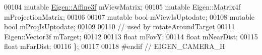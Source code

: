 \begin{DoxyCode}
00104     \textcolor{keyword}{mutable} \hyperlink{group___geometry___module_class_eigen_1_1_transform}{Eigen::Affine3f} mViewMatrix;
00105     \textcolor{keyword}{mutable} Eigen::Matrix4f mProjectionMatrix;
00106 
00107     \textcolor{keyword}{mutable} \textcolor{keywordtype}{bool} mViewIsUptodate;
00108     \textcolor{keyword}{mutable} \textcolor{keywordtype}{bool} mProjIsUptodate;
00109 
00110     \textcolor{comment}{// used by rotateAroundTarget}
00111     Eigen::Vector3f mTarget;
00112     
00113     \textcolor{keywordtype}{float} mFovY;
00114     \textcolor{keywordtype}{float} mNearDist;
00115     \textcolor{keywordtype}{float} mFarDist;
00116 \};
00117 
00118 \textcolor{preprocessor}{#endif // EIGEN\_CAMERA\_H}
\end{DoxyCode}
